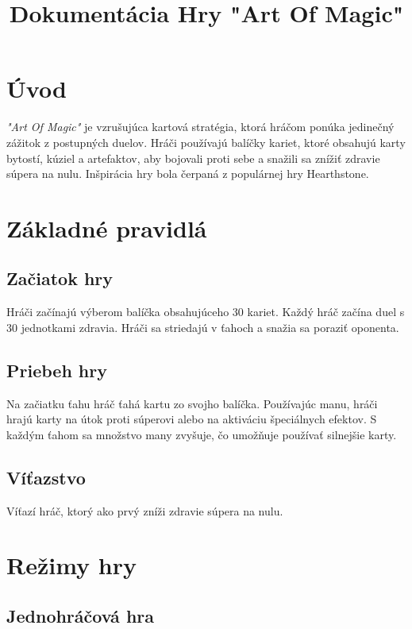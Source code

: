 \documentclass[12pt]{article}
\title{\textbf{Dokumentácia Hry "Art Of Magic"}}
\author{}
\date{}
\begin{document}
\maketitle

\section{Úvod}

\textit{"Art Of Magic"}  je vzrušujúca kartová stratégia, ktorá hráčom ponúka jedinečný zážitok z postupných duelov. Hráči používajú balíčky kariet, ktoré obsahujú karty bytostí, kúziel a artefaktov, aby bojovali proti sebe a snažili sa znížiť zdravie súpera na nulu. Inšpirácia hry bola čerpaná z populárnej hry Hearthstone.

\section{Základné pravidlá}

\subsection{Začiatok hry}

Hráči začínajú výberom balíčka obsahujúceho 30 kariet. Každý hráč začína duel s 30 jednotkami zdravia. Hráči sa striedajú v ťahoch a snažia sa poraziť oponenta.

\subsection{Priebeh hry}

Na začiatku ťahu hráč ťahá kartu zo svojho balíčka. Používajúc manu, hráči hrajú karty na útok proti súperovi alebo na aktiváciu špeciálnych efektov. S každým ťahom sa množstvo many zvyšuje, čo umožňuje používať silnejšie karty.

\subsection{Víťazstvo}

Víťazí hráč, ktorý ako prvý zníži zdravie súpera na nulu.

\section{Režimy hry}

\subsection{Jednohráčová hra}
\end{document}
